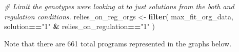 \documentclass[
]{book}
\newenvironment{Shaded}{\begin{snugshade}}{\end{snugshade}}
\newcommand{\CommentTok}[1]{\textcolor[rgb]{0.56,0.35,0.01}{\textit{#1}}}
\newcommand{\KeywordTok}[1]{\textcolor[rgb]{0.13,0.29,0.53}{\textbf{#1}}}
\newcommand{\NormalTok}[1]{#1}
\newcommand{\OperatorTok}[1]{\textcolor[rgb]{0.81,0.36,0.00}{\textbf{#1}}}
\newcommand{\StringTok}[1]{\textcolor[rgb]{0.31,0.60,0.02}{#1}}
\begin{document}
\begin{Shaded}
\begin{Highlighting}[]
\CommentTok{\# Limit the genotypes we\textquotesingle{}re looking at to just solutions from the \textquotesingle{}both\textquotesingle{} and \textquotesingle{}regulation\textquotesingle{} conditions.}
\NormalTok{relies\_on\_reg\_orgs \textless{}{-}}\StringTok{ }\KeywordTok{filter}\NormalTok{(}
\NormalTok{  max\_fit\_org\_data,}
\NormalTok{  solution}\OperatorTok{==}\StringTok{"1"} \OperatorTok{\&}\StringTok{ }\NormalTok{relies\_on\_regulation}\OperatorTok{==}\StringTok{"1"}
\NormalTok{)}
\end{Highlighting}
\end{Shaded}

Note that there are 661 total programs represented in the graphs below.
\end{document}
